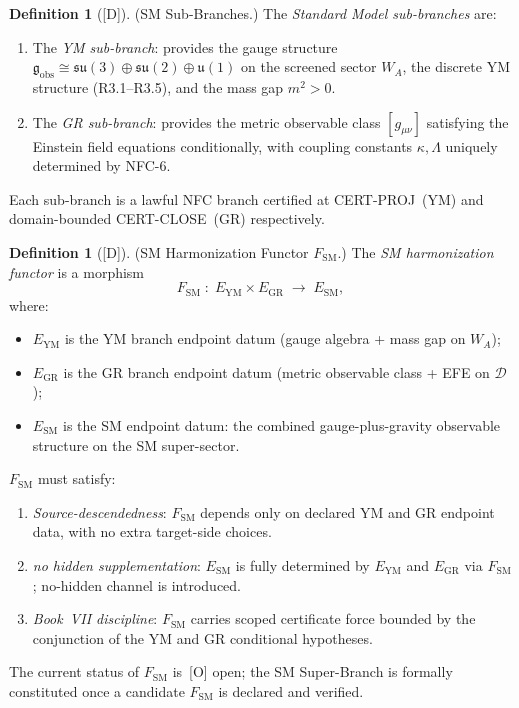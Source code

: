 \documentclass[12pt,oneside]{amsbook}
\theoremstyle{plain}
\theoremstyle{definition}
\newtheorem{definition}[theorem]{Definition}
\theoremstyle{remark}
\newcommand{\status}[1]{\textup{[#1]}}
\begin{document}
\begin{definition}[\status{D}]\label{def:SM-sub-branches}
\textup{(SM Sub-Branches.)}
The \emph{Standard Model sub-branches} are:
\begin{enumerate}[label=\textup{(\arabic*)}]
 \item The \emph{YM sub-branch}: provides the gauge structure
 $\mathfrak{g}_{\mathrm{obs}} \cong
 \mathfrak{su}(3)\oplus\mathfrak{su}(2)\oplus\mathfrak{u}(1)$
 on the screened sector $W_A$, the discrete YM structure
 (R3.1--R3.5), and the mass gap $m^2 > 0$.
 \item The \emph{GR sub-branch}: provides the metric observable
 class $[g_{\mu\nu}]$ satisfying the Einstein field equations
 conditionally, with coupling constants $\kappa, \Lambda$
 uniquely determined by NFC-6.
\end{enumerate}
Each sub-branch is a lawful NFC branch certified at
CERT-PROJ~(YM) and domain-bounded CERT-CLOSE~(GR) respectively.
\end{definition}

\begin{definition}[\status{D}]\label{def:SM-harmonization-functor}
\textup{(SM Harmonization Functor $F_{\mathrm{SM}}$.)}
The \emph{SM harmonization functor} is a morphism
\[
 F_{\mathrm{SM}} \;:\; E_{\mathrm{YM}} \times E_{\mathrm{GR}}
 \;\longrightarrow\; E_{\mathrm{SM}},
\]
where:
\begin{itemize}
 \item $E_{\mathrm{YM}}$ is the YM branch endpoint datum
 (gauge algebra + mass gap on $W_A$);
 \item $E_{\mathrm{GR}}$ is the GR branch endpoint datum
 (metric observable class + EFE on $\mathcal{D}$);
 \item $E_{\mathrm{SM}}$ is the SM endpoint datum: the combined
 gauge-plus-gravity observable structure on the SM super-sector.
\end{itemize}
$F_{\mathrm{SM}}$ must satisfy:
\begin{enumerate}[label=\textup{(\arabic*)}]
 \item \emph{Source-descendedness}: $F_{\mathrm{SM}}$ depends
 only on declared YM and GR endpoint data, with no extra
 target-side choices.
 \item \emph{no hidden supplementation}: $E_{\mathrm{SM}}$ is
 fully determined by $E_{\mathrm{YM}}$ and $E_{\mathrm{GR}}$
 via $F_{\mathrm{SM}}$; no-hidden channel is introduced.
 \item \emph{Book~VII discipline}: $F_{\mathrm{SM}}$ carries
 scoped certificate force bounded by the conjunction of the
 YM and GR conditional hypotheses.
\end{enumerate}
The current status of $F_{\mathrm{SM}}$ is~[O] open; the SM
Super-Branch is formally constituted once a candidate
$F_{\mathrm{SM}}$ is declared and verified.
\end{definition}
\end{document}
